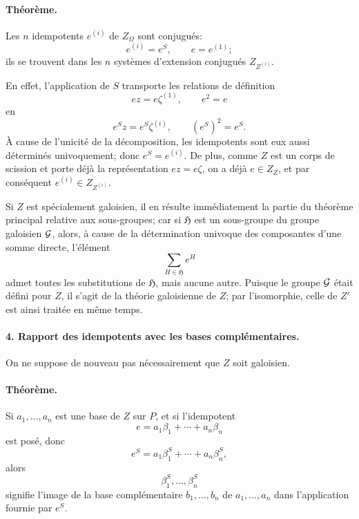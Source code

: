 \paragraph{Théorème.}
Les \(n\) idempotents \(e^{(i)}\) de \(Z_\Omega\) sont conjugués:
\[
        e^{(i)}=e^S,\qquad e=e^{(1)};
\]
ils se trouvent dans les \(n\) systèmes d'extension conjugués \(Z_{Z^{(i)}}\).

En effet, l'application de \(S\) transporte les relations de définition
\[
        ez=e\zeta^{(1)},\qquad e^2=e
\]
en
\[
        e^S z=e^S\zeta^{(i)},\qquad (e^S)^2=e^S .
\]
À cause de l'unicité de la décomposition, les idempotents sont eux aussi déterminés univoquement; donc \(e^S=e^{(i)}\). De plus, comme \(Z\) est un corps de scission et porte déjà la représentation \(ez=e\zeta\), on a déjà \(e\in Z_Z\), et par conséquent \(e^{(i)}\in Z_{Z^{(i)}}\).

Si \(Z\) est spécialement galoisien, il en résulte immédiatement la partie du théorème principal relative aux sous-groupes; car si \(\mathfrak H\) est un sous-groupe du groupe galoisien \(\mathcal G\), alors, à cause de la détermination univoque des composantes d'une somme directe, l'élément
\[
        \sum_{H\in\mathfrak H} e^H
\]
admet toutes les substitutions de \(\mathfrak H\), mais aucune autre. Puisque le groupe \(\mathcal G\) était défini pour \(Z\), il s'agit de la théorie galoisienne de \(Z\); par l'isomorphie, celle de \(Z'\) est ainsi traitée en même temps.

\paragraph{4. Rapport des idempotents avec les bases complémentaires.}
On ne suppose de nouveau pas nécessairement que \(Z\) soit galoisien.

\paragraph{Théorème.}
Si \(a_1,\ldots,a_n\) est une base de \(Z\) sur \(P\), et si l'idempotent
\[
        e=a_1\beta_1+\cdots+a_n\beta_n
\]
est posé, donc
\[
        e^S=a_1\beta_1^S+\cdots+a_n\beta_n^S,
\]
alors
\[
        \beta_1^S,\ldots,\beta_n^S
\]
signifie l'image de la base complémentaire \(b_1,\ldots,b_n\) de \(a_1,\ldots,a_n\) dans l'application fournie par \(e^S\).

